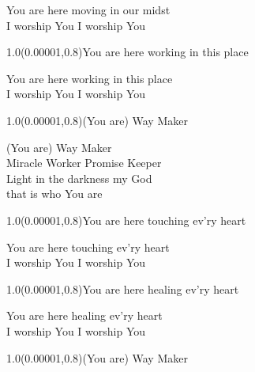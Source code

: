 \documentclass[aspectratio=169]{beamer}
\begin{document}
\color{white}
\begin{frame}
\centering
\color{white}
\huge{You are here moving in our midst} \\
\huge{I worship You I worship You} \\

\begin{textblock}{1.0}(0.00001,0.8)\color{gray}\normalsize{You are here working in this place}\end{textblock}
\end{frame}

\begin{frame}
\centering
\color{white}
\huge{You are here working in this place} \\
\huge{I worship You I worship You} \\

\begin{textblock}{1.0}(0.00001,0.8)\color{gray}\normalsize{(You are) Way Maker}\end{textblock}
\end{frame}

\begin{frame}
\centering
\color{white}
\huge{(You are) Way Maker} \\
\huge{Miracle Worker Promise Keeper} \\
\huge{Light in the darkness my God} \\
\huge{that is who You are} \\

\begin{textblock}{1.0}(0.00001,0.8)\color{gray}\normalsize{You are here touching ev'ry heart}\end{textblock}
\end{frame}

\begin{frame}
\centering
\color{white}
\huge{You are here touching ev'ry heart} \\
\huge{I worship You I worship You} \\

\begin{textblock}{1.0}(0.00001,0.8)\color{gray}\normalsize{You are here healing ev'ry heart}\end{textblock}
\end{frame}

\begin{frame}
\centering
\color{white}
\huge{You are here healing ev'ry heart} \\
\huge{I worship You I worship You} \\

\begin{textblock}{1.0}(0.00001,0.8)\color{gray}\normalsize{(You are) Way Maker}\end{textblock}
\end{frame}
\end{document}
